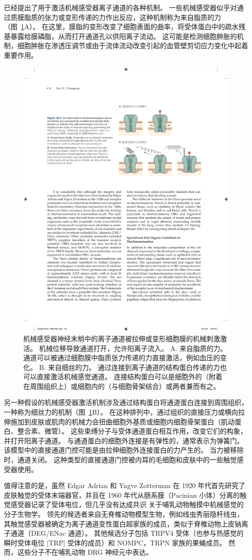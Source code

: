 已经提出了用于激活机械感受器离子通道的各种机制。
一些机械感受器似乎对通过质膜脂质的张力或变形传递的力作出反应，这种机制称为来自脂质的力（图~\ref{fig:18_5}A）。
在这里，膜脂的变形改变了细胞表面的曲率，将受体蛋白中的疏水残基暴露给膜磷脂，从而打开通道孔以供阳离子流动。
这可能是检测细胞肿胀的机制，细胞肿胀在渗透压调节或由于流体流动改变引起的血管壁剪切应力变化中起着重要作用。


\begin{figure}[htbp]
	\centering
	\includegraphics[width=0.5\linewidth]{chap18/fig_18_5}
	\caption{机械感受器神经末梢中的离子通道被拉伸或变形细胞膜的机械刺激激活。
		机械位移导致通道打开，允许阳离子流入\cite{lin2005trp}。
		A. 来自脂质的力。
		通道可以被通过细胞膜中脂质张力传递的力直接激活，例如血压的变化。
		B. 来自细丝的力。
		通过连接到离子通道的结构蛋白传递的力也可以直接激活机械感觉通道。
		连接结构蛋白可以是细胞外的（附着在周围组织上）或细胞内的（与细胞骨架结合）或两者兼而有之。}
	\label{fig:18_5}
\end{figure}


另一种假设的机械感受器激活机制涉及通过结构蛋白将通道蛋白连接到周围组织，一种称为细丝力的机制（图~\ref{fig:18_5}B）。
在这种排列中，通过组织的直接压力或横向拉伸施加到皮肤或肌肉的机械力会扭曲细胞外基质或细胞内细胞骨架蛋白（肌动蛋白、整合素、微管）。
这些束缚分子与受体通道蛋白相互作用，改变它们的构象，并打开阳离子通道。
与通道蛋白的细胞外连接是有弹性的，通常表示为弹簧门。
该模型中的直接通道门控可能是由拉伸细胞外连接蛋白的力产生的。
当力被移除时，通道关闭。
这种类型的直接通道门控被内耳的毛细胞和皮肤中的一些触觉感受器使用。


值得注意的是，虽然 Edgar Adrian 和 Yngve Zotterman 在 1920 年代首先研究了皮肤触觉的受体末端器官，并且在 1960 年代从肠系膜（Pacinian 小体）分离的触觉感受器记录了受体电位，但几乎没有达成共识 关于哺乳动物触摸中机械感觉的分子生物学。
领先的候选者来自无脊椎动物模型生物，例如线虫秀丽隐杆线虫，其触觉感受器被确定为离子通道变性蛋白超家族的成员，类似于脊椎动物上皮钠离子通道（DEG/ENac 通道）。
其他候选分子包括 TRPV4 受体（也参与热感觉的瞬时受体电位 [TRP] 受体的成员）和 NOMPC，TRPN 家族的果蝇成员。
然而，这些分子不在哺乳动物 DRG 神经元中表达。



